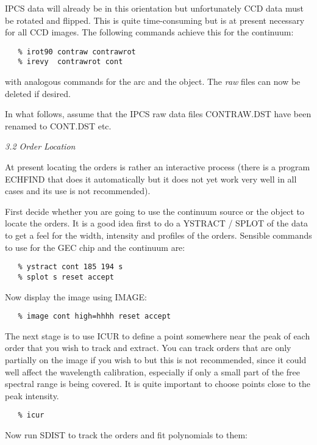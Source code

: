 IPCS data will already be in this orientation but unfortunately CCD data
must be rotated and flipped. This is quite time-consuming but is at present
necessary for all CCD images. The following commands achieve this for the
continuum:

\begin{verbatim}
   % irot90 contraw contrawrot
   % irevy  contrawrot cont
\end{verbatim}

with analogous commands for the arc and the object. The {\it raw} files can
now be deleted if desired.

In what follows, assume that the IPCS raw data files CONTRAW.DST have been
renamed to CONT.DST etc.


\goodbreak
\vspace{12pt}
{\it 3.2 Order Location}

At present locating the orders is rather an interactive process (there is
a program ECHFIND that does it automatically but it does not yet work very
well in all cases and its use is not recommended).

First decide whether you are going to use the continuum source or the object to
locate the orders. It is a good idea first to do a YSTRACT / SPLOT of the data
to get a feel for the width, intensity and profiles of the orders. Sensible
commands to use for the GEC chip and the continuum are:

\begin{verbatim}
   % ystract cont 185 194 s
   % splot s reset accept
\end{verbatim}

Now display the image using IMAGE:

\begin{verbatim}
   % image cont high=hhhh reset accept
\end{verbatim}

The next stage is to use ICUR
to define a point somewhere near the peak of each
order that you wish to track and extract. You can track orders that are only
partially on the image if you wish to but this is not recommended, since it
could well affect the wavelength calibration, especially if only a small part
of the free spectral range is being covered. It is quite important to choose
points close to the peak intensity.

\begin{verbatim}
   % icur
\end{verbatim}

Now run SDIST to track the orders and fit polynomials to them:

